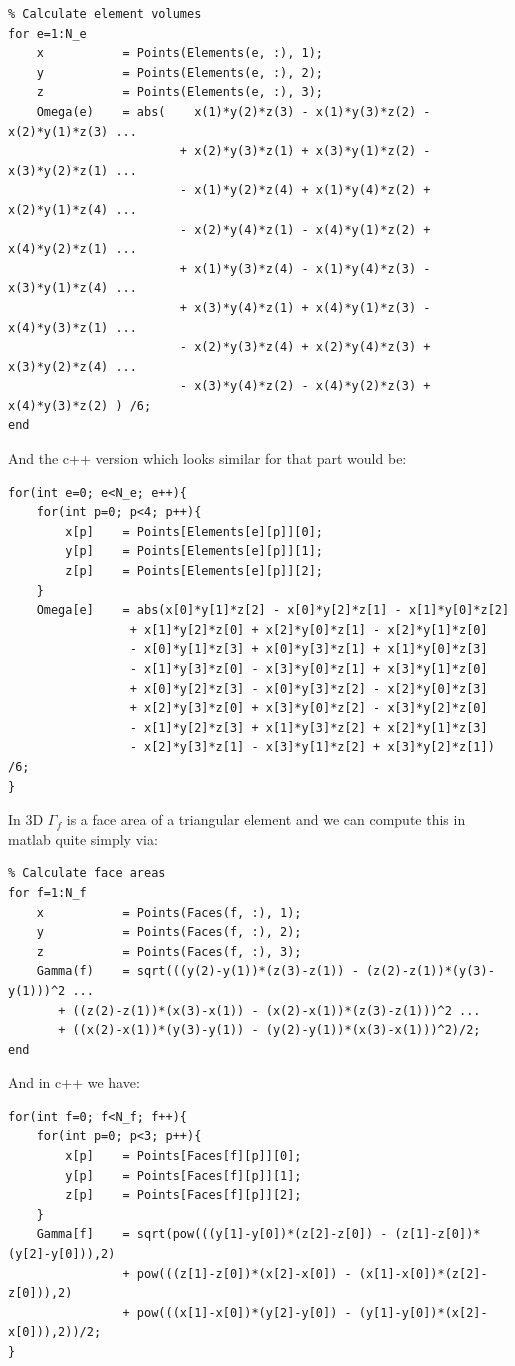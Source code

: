 \documentclass[12pt]{article}
\begin{document}
\begin{lstlisting}
% Calculate element volumes
for e=1:N_e	
	x           = Points(Elements(e, :), 1);
	y           = Points(Elements(e, :), 2);
	z           = Points(Elements(e, :), 3);
	Omega(e)	= abs(    x(1)*y(2)*z(3) - x(1)*y(3)*z(2) - x(2)*y(1)*z(3) ...
						+ x(2)*y(3)*z(1) + x(3)*y(1)*z(2) - x(3)*y(2)*z(1) ...
						- x(1)*y(2)*z(4) + x(1)*y(4)*z(2) + x(2)*y(1)*z(4) ...
						- x(2)*y(4)*z(1) - x(4)*y(1)*z(2) + x(4)*y(2)*z(1) ...
						+ x(1)*y(3)*z(4) - x(1)*y(4)*z(3) - x(3)*y(1)*z(4) ...
						+ x(3)*y(4)*z(1) + x(4)*y(1)*z(3) - x(4)*y(3)*z(1) ...
						- x(2)*y(3)*z(4) + x(2)*y(4)*z(3) + x(3)*y(2)*z(4) ...
						- x(3)*y(4)*z(2) - x(4)*y(2)*z(3) + x(4)*y(3)*z(2) ) /6;
end
\end{lstlisting}

And the c++ version which looks similar for that part would be:

\begin{lstlisting}[style=MyC++Style]
for(int e=0; e<N_e; e++){
	for(int p=0; p<4; p++){
		x[p]	= Points[Elements[e][p]][0];
		y[p]	= Points[Elements[e][p]][1];
		z[p]	= Points[Elements[e][p]][2];
	}
	Omega[e]    = abs(x[0]*y[1]*z[2] - x[0]*y[2]*z[1] - x[1]*y[0]*z[2]
				 + x[1]*y[2]*z[0] + x[2]*y[0]*z[1] - x[2]*y[1]*z[0]
				 - x[0]*y[1]*z[3] + x[0]*y[3]*z[1] + x[1]*y[0]*z[3]
				 - x[1]*y[3]*z[0] - x[3]*y[0]*z[1] + x[3]*y[1]*z[0]
				 + x[0]*y[2]*z[3] - x[0]*y[3]*z[2] - x[2]*y[0]*z[3]
				 + x[2]*y[3]*z[0] + x[3]*y[0]*z[2] - x[3]*y[2]*z[0]
				 - x[1]*y[2]*z[3] + x[1]*y[3]*z[2] + x[2]*y[1]*z[3]
				 - x[2]*y[3]*z[1] - x[3]*y[1]*z[2] + x[3]*y[2]*z[1]) /6;
}
\end{lstlisting}

In 3D $\Gamma_f$ is a face area of a triangular element and we can compute this in matlab quite simply via:

\begin{lstlisting}
% Calculate face areas
for f=1:N_f	
	x           = Points(Faces(f, :), 1);
	y           = Points(Faces(f, :), 2);
	z           = Points(Faces(f, :), 3);
	Gamma(f)	= sqrt(((y(2)-y(1))*(z(3)-z(1)) - (z(2)-z(1))*(y(3)-y(1)))^2 ... 
	   + ((z(2)-z(1))*(x(3)-x(1)) - (x(2)-x(1))*(z(3)-z(1)))^2 ...
	   + ((x(2)-x(1))*(y(3)-y(1)) - (y(2)-y(1))*(x(3)-x(1)))^2)/2;
end
\end{lstlisting}

And in c++ we have:

\begin{lstlisting}[style=MyC++Style]
for(int f=0; f<N_f; f++){
	for(int p=0; p<3; p++){
		x[p]	= Points[Faces[f][p]][0];
		y[p]	= Points[Faces[f][p]][1];
		z[p]	= Points[Faces[f][p]][2];
	}
	Gamma[f]	= sqrt(pow(((y[1]-y[0])*(z[2]-z[0]) - (z[1]-z[0])*(y[2]-y[0])),2)
				+ pow(((z[1]-z[0])*(x[2]-x[0]) - (x[1]-x[0])*(z[2]-z[0])),2)
				+ pow(((x[1]-x[0])*(y[2]-y[0]) - (y[1]-y[0])*(x[2]-x[0])),2))/2;
}
\end{lstlisting}
\end{document}
